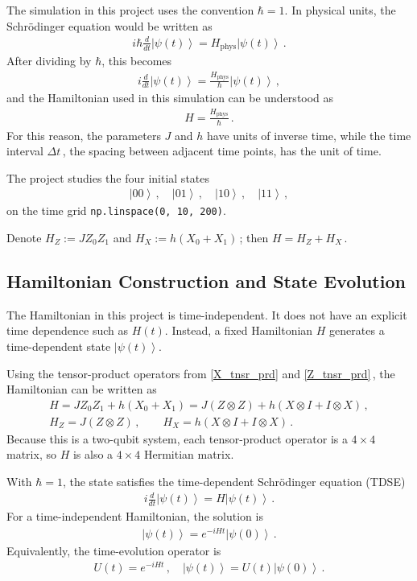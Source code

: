 \documentclass[11pt]{article}
\numberwithin{equation}{section}
\newcommand{\ket}[1]{\left| #1 \right\rangle} %
\begin{document}
The simulation in this project uses the convention $\hbar=1$. In physical units, the Schrödinger equation would be written as
\begin{align*}
  i\hbar\frac{d}{dt}\ket{\psi(t)} = H_{\mathrm{phys}}\ket{\psi(t)} \,.
\end{align*}
After dividing by $\hbar$, this becomes
\begin{align*}
  i\frac{d}{dt}\ket{\psi(t)} = \frac{H_{\mathrm{phys}}}{\hbar}\ket{\psi(t)}\,,
\end{align*}
and the Hamiltonian used in this simulation can be understood as
\begin{align*}
  H = \frac{H_{\mathrm{phys}}}{\hbar}\,.
\end{align*}
For this reason, the parameters $J$ and $h$ have units of inverse time, while the time interval $\Delta t$\,, the spacing between adjacent time points, has the unit of time.

The project studies the four initial states
\begin{align*}
  \ket{00} \,, \quad \ket{01} \,, \quad \ket{10} \,, \quad \ket{11} \,,
\end{align*}
on the time grid \texttt{np.linspace(0, 10, 200)}.

Denote $H_Z := J Z_0 Z_1$ and  $H_X := h(X_0 + X_1)$\,; then $H = H_Z + H_X$\,.

\subsection{Hamiltonian Construction and State Evolution}
The Hamiltonian in this project is time-independent. It does not have an explicit time dependence such as $H(t)$. Instead, a fixed Hamiltonian $H$ generates a time-dependent state $\ket{\psi(t)}$.

Using the tensor-product operators from \eqref{X_tnsr_prd} and \eqref{Z_tnsr_prd}\,, the Hamiltonian can be written as
\begin{gather*}
  H = J Z_0 Z_1 + h(X_0 + X_1) = J(Z \otimes Z) + h(X \otimes I + I \otimes X) \,, \\
  H_Z = J(Z \otimes Z) \,, \qquad H_X = h(X \otimes I + I \otimes X) \,.
\end{gather*}
Because this is a two-qubit system, each tensor-product operator is a $4 \times 4$ matrix, so $H$ is also a $4 \times 4$ Hermitian matrix.

With $\hbar=1$, the state satisfies the time-dependent Schrödinger equation (TDSE)
\begin{align}
  i\frac{d}{dt}\ket{\psi(t)} = H\ket{\psi(t)} \,.
\end{align}
For a time-independent Hamiltonian, the solution is
\begin{align}
  \ket{\psi(t)} = e^{-iHt}\ket{\psi(0)} \,.
\end{align}
Equivalently, the time-evolution operator is
\begin{align}
  U(t) = e^{-iHt} \,, \quad  \ket{\psi(t)} = U(t)\ket{\psi(0)} \,.
\end{align}
\end{document}
